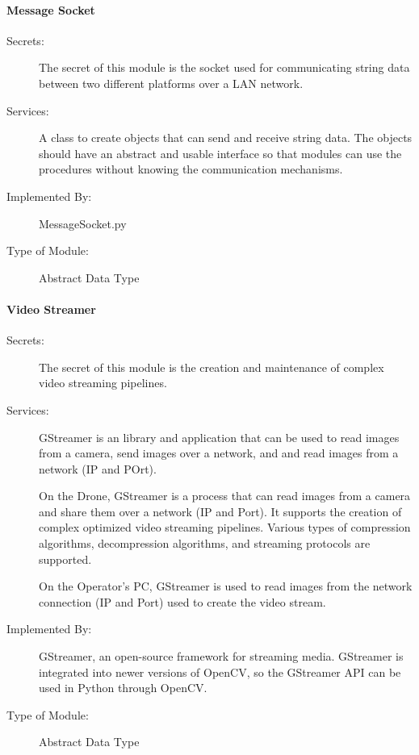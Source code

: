 \documentclass[12pt, titlepage]{article}
\begin{document}
\paragraph{Message Socket}
\label{Message Socket}
\begin{description}
\item[Secrets:] The secret of this module is the socket used for communicating string data between two
different platforms over a LAN network.
\item[Services:] A class to create objects that can send and receive string data. The objects should have an abstract and usable interface so that modules can use the procedures without knowing the communication mechanisms.
\item[Implemented By:] MessageSocket.py
\item[Type of Module:] Abstract Data Type
\end{description}

\paragraph{Video Streamer}
\label{GStreamer}
\begin{description}
\item[Secrets:] The secret of this module is the creation and maintenance of complex video streaming pipelines.
\item[Services:] GStreamer is an library and application that can be used to read images from a camera, send images over a network, and and read images from a network (IP and POrt).

On the Drone, GStreamer is a process that can read images from a camera and share them over a network (IP and Port). It supports the creation of complex optimized video streaming pipelines. Various types of  compression algorithms, decompression algorithms, and streaming protocols are supported.

On the Operator's PC, GStreamer is used to read images from the network connection (IP and Port) used to create the video stream.

\item[Implemented By:] GStreamer, an open-source framework for streaming media. GStreamer is integrated into newer versions of OpenCV, so the GStreamer API can be used in Python through OpenCV.
\item[Type of Module:] Abstract Data Type
\end{description}
\end{document}
